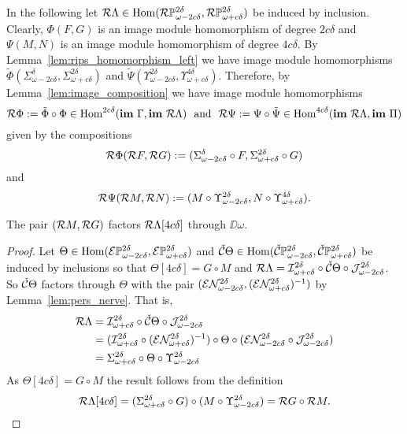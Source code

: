 In the following let $\mathcal{R}\Lambda\in\mathrm{Hom}(\mathcal{R}\mathbb{P}_{\omega-2c\delta}^{2\delta},\mathcal{R}\mathbb{P}_{\omega+c\delta}^{2\delta})$ be induced by inclusion.
Clearly, $\Phi(F, G)$ is an image module homomorphism of degree $2c\delta$ and $\Psi(M, N)$ is an image module homomorphism of degree $4c\delta$.
By Lemma~\ref{lem:rips_homomorphism_left} we have image module homomorphisms $\tilde{\Phi}(\Sigma_{\omega-2c\delta}^\delta, \Sigma_{\omega+c\delta}^{2\delta})$ and $\tilde{\Psi}(\Upsilon_{\omega-2c\delta}^{2\delta}, \Upsilon_{\omega+c\delta}^{4\delta})$.
Therefore, by Lemma~\ref{lem:image_composition} we have image module homomorphisms
\[ \rips\Phi := \tilde{\Phi}\circ\Phi\in\Hom^{2c\delta}(\im~\Gamma,\im~\rips\Lambda)\ \text{ and }\ \rips\Psi :=\Psi\circ\tilde{\Psi}\in\Hom^{4c\delta}(\im~\rips\Lambda, \im~\Pi)\] given by the compositions
\[ \mathcal{R}\Phi(\mathcal{R} F, \mathcal{R} G) := (\Sigma_{\omega-2c\delta}^\delta\circ F, \Sigma_{\omega+c\delta}^{2\delta}\circ G)\]
and
\[ \mathcal{R}\Psi(\mathcal{R} M, \mathcal{R} N) := (M\circ \Upsilon_{\omega-2c\delta}^{2\delta}, N\circ\Upsilon_{\omega+c\delta}^{4\delta}).\]

\begin{lemma}\label{lem:rips_factor_mid}
  The pair $(\mathcal{R} M, \mathcal{R} G)$ factors $\mathcal{R}\Lambda[4c\delta]$ through $\DD{\omega}$.
\end{lemma}
\begin{proof}
  Let $\Theta\in\mathrm{Hom}(\mathcal{E} \mathbb{P}_{\omega-2c\delta}^{2\delta},\mathcal{E} \mathbb{P}_{\omega+c\delta}^{2\delta})$ and $\check{\mathcal{C}}\Theta\in\mathrm{Hom}(\check{\mathcal{C}}\mathbb{P}_{\omega-2c\delta}^{2\delta}, \check{\mathcal{C}}\mathbb{P}_{\omega+c\delta}^{2\delta})$ be induced by inclusions so that $\Theta[4c\delta] = G\circ M$ and $\mathcal{R}\Lambda = \mathcal{I}_{\omega+c\delta}^{2\delta}\circ\check{\mathcal{C}}\Theta\circ\mathcal{J}_{\omega-2c\delta}^{2\delta}$.
  So $\check{\mathcal{C}}\Theta$ factors through $\Theta$ with the pair $(\mathcal{E}\mathcal{N}_{\omega-2c\delta}^{2\delta}, (\mathcal{E}\mathcal{N}_{\omega+c\delta}^{2\delta})^{-1})$ by Lemma~\ref{lem:pers_nerve}.
  That is,
  \begin{align*}
    \mathcal{R}\Lambda &= \mathcal{I}_{\omega+c\delta}^{2\delta}\circ\check{\mathcal{C}}\Theta\circ\mathcal{J}_{\omega-2c\delta}^{2\delta}\\
      &= (\mathcal{I}_{\omega+c\delta}^{2\delta}\circ (\mathcal{E}\mathcal{N}_{\omega+c\delta}^{2\delta})^{-1})\circ \Theta\circ (\mathcal{E}\mathcal{N}_{\omega-2c\delta}^{2\delta}\circ \mathcal{J}_{\omega-2c\delta}^{2\delta})\\
      &= \Sigma_{\omega+c\delta}^{2\delta}\circ \Theta\circ \Upsilon_{\omega-2c\delta}^{2\delta}\\
  \end{align*}
  As $\Theta[4c\delta] = G\circ M$ the result follows from the definition
  \[ \mathcal{R}\Lambda[4c\delta] = (\Sigma_{\omega+c\delta}^{2\delta}\circ G)\circ (M\circ \Upsilon_{\omega-2c\delta}^{2\delta}) = \mathcal{R} G\circ \mathcal{R} M.\]
\end{proof}

